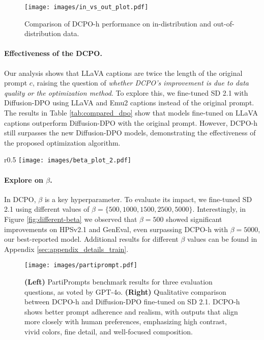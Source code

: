 \begin{figure}[t]
    \centering
    \texttt{[image: images/in\_vs\_out\_plot.pdf]}
    \vspace{-2em}
    \caption{Comparison of DCPO-h performance on in-distribution and out-of-distribution data.}
    \label{fig:in-vs-out}
\end{figure}




\paragraph{Effectiveness of the DCPO.} Our analysis shows that LLaVA captions are twice the length of the original prompt \( c \), raising the question of \textit{whether DCPO's improvement is due to data quality or the optimization method}. To explore this, we fine-tuned SD 2.1 with Diffusion-DPO using LLaVA and Emu2 captions instead of the original prompt. The results in Table \ref{tab:compared_dpo} show that models fine-tuned on LLaVA captions outperform Diffusion-DPO with the original prompt. However, DCPO-h still surpasses the new Diffusion-DPO models, demonstrating the effectiveness of the proposed optimization algorithm.

\begin{wrapfigure}{r}{0.5\linewidth}
\vspace{-1.5em}
\texttt{[image: images/beta\_plot\_2.pdf]}
\caption{DCPO-h performance comparison across various \( \beta \) values, evaluated on HPSv2.1 and GenEval.}
\vspace{-1.75em}
\label{fig:different-beta}
\end{wrapfigure} 

\paragraph{Explore on $\beta$.} In DCPO, \( \beta \) is a key hyperparameter. To evaluate its impact, we fine-tuned SD 2.1 using different values of \( \beta = \{500, 1000, 1500, 2500, 5000\} \). Interestingly, in Figure \ref{fig:different-beta} we observed that \( \beta = 500 \) showed significant improvements on HPSv2.1 and GenEval, even surpassing DCPO-h with \( \beta = 5000 \), our best-reported model. Additional results for different \( \beta \) values can be found in Appendix \ref{sec:appendix_details_train}.




\begin{figure}[t]
    \centering
    \vspace{-1.5em}
    \texttt{[image: images/partiprompt.pdf]}
    \vspace{-1.5em}
    \caption{\textbf{(Left)} PartiPrompts benchmark results for three evaluation questions, as voted by GPT-4o. \textbf{(Right)} Qualitative comparison between DCPO-h and Diffusion-DPO fine-tuned on SD 2.1. DCPO-h shows better prompt adherence and realism, with outputs that align more closely with human preferences, emphasizing high contrast, vivid colors, fine detail, and well-focused composition.}
    \label{fig:evaluation_gpt4o}
\end{figure}


